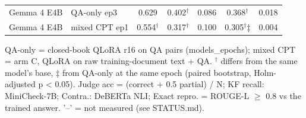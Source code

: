\begin{table}[t]
{\begin{tabular}{llccccc}
Gemma 4 E4B & QA-only ep3 & 0.629 & 0.402$^\dagger$ & 0.086 & 0.368$^\dagger$ & 0.018 \\
Gemma 4 E4B & mixed CPT ep1 & 0.554$^\dagger$ & 0.317$^\dagger$ & 0.100 & 0.305$^\dagger$‡ & 0.004 \\
\bottomrule
\end{tabular}}
\par\smallskip\footnotesize QA-only = closed-book QLoRA r16 on QA pairs (models\_epochs); mixed CPT = arm C, QLoRA on raw training-document text + QA. $^\dagger$ differs from the same model's base, ‡ from QA-only at the same epoch (paired bootstrap, Holm-adjusted p < 0.05). Judge acc = (correct + 0.5 partial) / N; KF recall: MiniCheck-7B; Contra.: DeBERTa NLI; Exact repro. = ROUGE-L $\geq$ 0.8 vs the trained answer. '–' = not measured (see STATUS.md).
\end{table}
